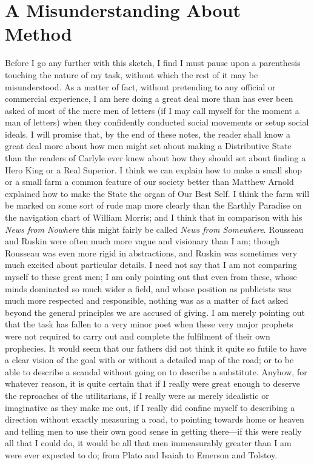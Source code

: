 \documentclass{book}
\begin{document}
\chapter{A Misunderstanding About Method}
\label{chapter-7}
Before I go any further with this sketch, I find I must pause upon a parenthesis touching the nature of my task, without which the rest of it may be misunderstood. As a matter of fact, without pretending to any official or commercial experience, I am here doing a great deal more than has ever been asked of most of the mere men of letters (if I may call myself for the moment a man of letters) when they confidently conducted social movements or setup social ideals. I will promise that, by the end of these notes, the reader shall know a great deal more about how men might set about making a Distributive State than the readers of Carlyle ever knew about how they should set about finding a Hero King or a Real Superior. I think we can explain how to make a small shop or a small farm a common feature of our society better than Matthew Arnold explained how to make the State the organ of Our Best Self. I think the farm will be marked on some sort of rude map more clearly than the Earthly Paradise on the navigation chart of William Morris; and I think that in comparison with his \emph{News from Nowhere} this might fairly be called \emph{News from Somewhere}. Rousseau and Ruskin were often much more vague and visionary than I am; though Rousseau was even more rigid in abstractions, and Ruskin was sometimes very much excited about particular details. I need not say that I am not comparing myself to these great men; I am only pointing out that even from these, whose minds dominated so much wider a field, and whose position as publicists was much more respected and responsible, nothing was as a matter of fact asked beyond the general principles we are accused of giving. I am merely pointing out that the task has fallen to a very minor poet when these very major prophets were not required to carry out and complete the fulfilment of their own prophecies. It would seem that our fathers did not think it quite so futile to have a clear vision of the goal with or without a detailed map of the road; or to be able to describe a scandal without going on to describe a substitute. Anyhow, for whatever reason, it is quite certain that if I really were great enough to deserve the reproaches of the utilitarians, if I really were as merely idealistic or imaginative as they make me out, if I really did confine myself to describing a direction without exactly measuring a road, to pointing towards home or heaven and telling men to use their own good sense in getting there—if this were really all that I could do, it would be all that men immeasurably greater than I am were ever expected to do; from Plato and Isaiah to Emerson and Tolstoy.
\end{document}
